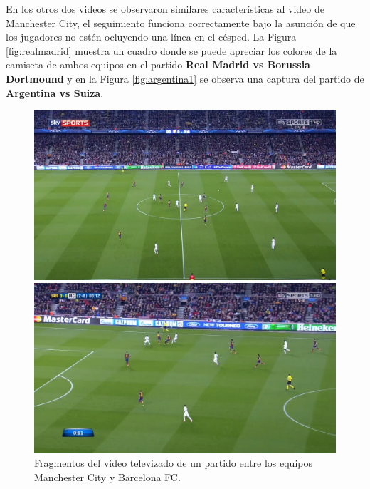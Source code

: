 En los otros dos videos se observaron similares características al video de
Manchester City, el seguimiento funciona correctamente bajo la asunción de que
los jugadores no estén ocluyendo una línea en el césped. La Figura
\ref{fig:realmadrid} muestra un cuadro donde se puede apreciar los colores de
la camiseta de ambos equipos en el partido \textbf{Real Madrid vs Borussia
Dortmound} y en la Figura \ref{fig:argentina1} se observa una captura del
partido de \textbf{Argentina vs Suiza}.


\begin{figure}[H]
    \centering
    \captionsetup{justification=centering}
    \begin{minipage}[t]{.45\textwidth}
        \centering
        \includegraphics[width=\linewidth]{./images/manchester1.png}
    \end{minipage}%
    \vspace{0.1cm}
    \begin{minipage}[t]{.45\textwidth}
        \centering
        \includegraphics[width=\linewidth]{./images/manchester2.png}
    \end{minipage}
    \caption{Fragmentos del video televizado de un partido entre los equipos Manchester City y Barcelona FC.
        \label{fig:manchester1}}
\end{figure}

